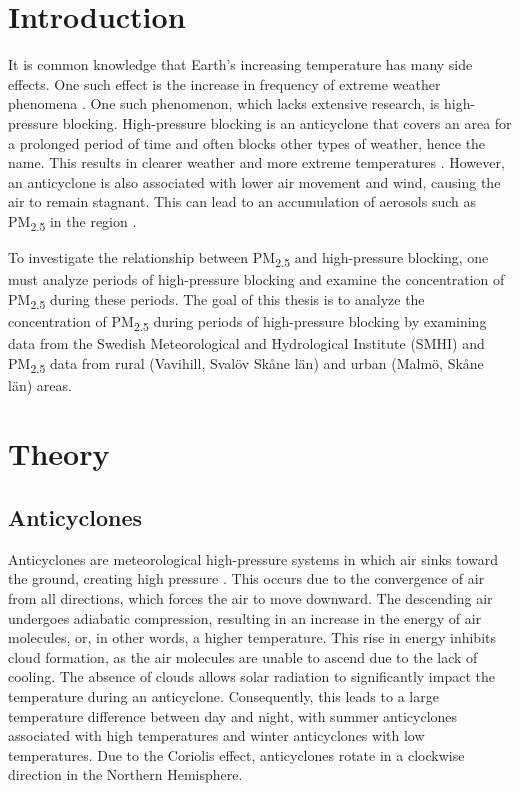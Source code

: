 \section{Introduction}
It is common knowledge that Earth's increasing temperature has many side effects. One such effect is the increase in frequency of extreme weather phenomena \cite{Mitchell2006}. One such phenomenon, which lacks extensive research, is high-pressure blocking. High-pressure blocking is an anticyclone that covers an area for a prolonged period of time and often blocks other types of weather, hence the name. This results in clearer weather and more extreme temperatures \cite{Lupo2020}. However, an anticyclone is also associated with lower air movement and wind, causing the air to remain stagnant. This can lead to an accumulation of aerosols such as PM\textsubscript{2.5} in the region \cite{Cai2020}.

To investigate the relationship between PM\textsubscript{2.5} and high-pressure blocking, one must analyze periods of high-pressure blocking and examine the concentration of PM\textsubscript{2.5} during these periods. The goal of this thesis is to analyze the concentration of PM\textsubscript{2.5} during periods of high-pressure blocking by examining data from the Swedish Meteorological and Hydrological Institute (SMHI) and PM\textsubscript{2.5} data from rural (Vavihill, Svalöv Skåne län) and urban (Malmö, Skåne län) areas.


\section{Theory}
\subsection{Anticyclones}
Anticyclones are meteorological high-pressure systems in which air sinks toward the ground, creating high pressure \cite{SpiridonovCuric2021}. This occurs due to the convergence of air from all directions, which forces the air to move downward. The descending air undergoes adiabatic compression, resulting in an increase in the energy of air molecules, or, in other words, a higher temperature. This rise in energy inhibits cloud formation, as the air molecules are unable to ascend due to the lack of cooling. The absence of clouds allows solar radiation to significantly impact the temperature during an anticyclone. Consequently, this leads to a large temperature difference between day and night, with summer anticyclones associated with high temperatures and winter anticyclones with low temperatures. Due to the Coriolis effect, anticyclones rotate in a clockwise direction in the Northern Hemisphere.

